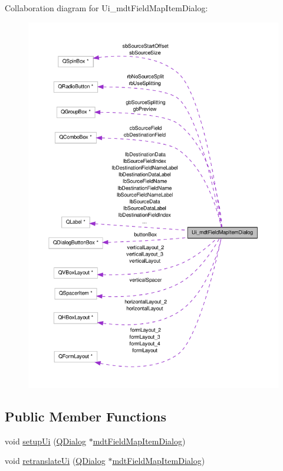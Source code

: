 Collaboration diagram for Ui\-\_\-mdt\-Field\-Map\-Item\-Dialog\-:
\nopagebreak
\begin{figure}[H]
\begin{center}
\leavevmode
\includegraphics[width=350pt]{class_ui__mdt_field_map_item_dialog__coll__graph}
\end{center}
\end{figure}
\subsection*{Public Member Functions}
\begin{DoxyCompactItemize}
\item 
void \hyperlink{class_ui__mdt_field_map_item_dialog_a4a5a2d0d5245eeb5137a8cbd82b6eb08}{setup\-Ui} (\hyperlink{class_q_dialog}{Q\-Dialog} $\ast$\hyperlink{classmdt_field_map_item_dialog}{mdt\-Field\-Map\-Item\-Dialog})
\item 
void \hyperlink{class_ui__mdt_field_map_item_dialog_a796164b7675186294e0880b78d6a4a3f}{retranslate\-Ui} (\hyperlink{class_q_dialog}{Q\-Dialog} $\ast$\hyperlink{classmdt_field_map_item_dialog}{mdt\-Field\-Map\-Item\-Dialog})
\end{DoxyCompactItemize}
